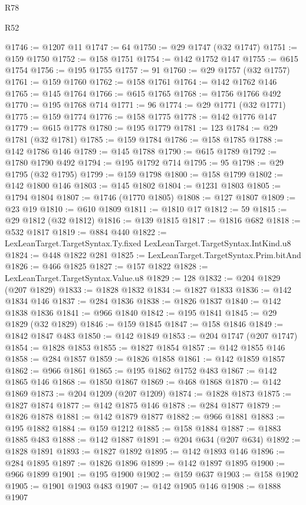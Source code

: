 \begin{lexlean}{R78}
\begin{lexlean}{R52}
\begin{coremodule}
{{{{{{{{{{{{{{{{{{{{{{{{{{{{{{{{{{{{{{{{{{{{{{{{{{{{{{{{{{{{{{{{{{{{{{{{{{{{{{{{{{{{{{{{{{{{{{{{{{{{{{{{{{{{{{{{{{{{{{{{{{{{{{{{{{{{{{{{{{{{{{{{{{{{{{{{{{{{{{{{{{{{{{{{{{{{{{{{{{{{{{{{{{{{{{{{{{{{{{@1746 := @1207 @11
@1747 := 64
@1750 := @29 @1747 (@32 @1747)
@1751 := @159 @1750
@1752 := @158 @1751
@1754 := @142 @1752 @147
@1755 := @615 @1754
@1756 := @195 @1755
@1757 := 91
@1760 := @29 @1757 (@32 @1757)
@1761 := @159 @1760
@1762 := @158 @1761
@1764 := @142 @1762 @146
@1765 := @145 @1764
@1766 := @615 @1765
@1768 := @1756 @1766 @492
@1770 := @195 @1768 @714
@1771 := 96
@1774 := @29 @1771 (@32 @1771)
@1775 := @159 @1774
@1776 := @158 @1775
@1778 := @142 @1776 @147
@1779 := @615 @1778
@1780 := @195 @1779
@1781 := 123
@1784 := @29 @1781 (@32 @1781)
@1785 := @159 @1784
@1786 := @158 @1785
@1788 := @142 @1786 @146
@1789 := @145 @1788
@1790 := @615 @1789
@1792 := @1780 @1790 @492
@1794 := @195 @1792 @714
@1795 := 95
@1798 := @29 @1795 (@32 @1795)
@1799 := @159 @1798
@1800 := @158 @1799
@1802 := @142 @1800 @146
@1803 := @145 @1802
@1804 := @1231 @1803
@1805 := @1794 @1804
@1807 := @1746 (@1770 @1805)
@1808 := @127 @1807
@1809 := @23 @19
@1810 := @610 @1809
@1811 := @1810 @17
@1812 := 59
@1815 := @29 @1812 (@32 @1812)
@1816 := @139 @1815
@1817 := @1816 @682
@1818 := @532 @1817
@1819 := @884 @440
@1822 := LexLeanTarget.TargetSyntax.Ty.fixed LexLeanTarget.TargetSyntax.IntKind.u8
@1824 := @448 @1822 @281
@1825 := LexLeanTarget.TargetSyntax.Prim.bitAnd
@1826 := @466 @1825
@1827 := @157 @1822
@1828 := LexLeanTarget.TargetSyntax.Value.u8
@1829 := 128
@1832 := @204 @1829 (@207 @1829)
@1833 := @1828 @1832
@1834 := @1827 @1833
@1836 := @142 @1834 @146
@1837 := @284 @1836
@1838 := @1826 @1837
@1840 := @142 @1838 @1836
@1841 := @966 @1840
@1842 := @195 @1841
@1845 := @29 @1829 (@32 @1829)
@1846 := @159 @1845
@1847 := @158 @1846
@1849 := @1842 @1847 @483
@1850 := @142 @1849
@1853 := @204 @1747 (@207 @1747)
@1854 := @1828 @1853
@1855 := @1827 @1854
@1857 := @142 @1855 @146
@1858 := @284 @1857
@1859 := @1826 @1858
@1861 := @142 @1859 @1857
@1862 := @966 @1861
@1865 := @195 @1862 @1752 @483
@1867 := @142 @1865 @146
@1868 := @1850 @1867
@1869 := @468 @1868
@1870 := @142 @1869
@1873 := @204 @1209 (@207 @1209)
@1874 := @1828 @1873
@1875 := @1827 @1874
@1877 := @142 @1875 @146
@1878 := @284 @1877
@1879 := @1826 @1878
@1881 := @142 @1879 @1877
@1882 := @966 @1881
@1883 := @195 @1882
@1884 := @159 @1212
@1885 := @158 @1884
@1887 := @1883 @1885 @483
@1888 := @142 @1887
@1891 := @204 @634 (@207 @634)
@1892 := @1828 @1891
@1893 := @1827 @1892
@1895 := @142 @1893 @146
@1896 := @284 @1895
@1897 := @1826 @1896
@1899 := @142 @1897 @1895
@1900 := @966 @1899
@1901 := @195 @1900
@1902 := @159 @637
@1903 := @158 @1902
@1905 := @1901 @1903 @483
@1907 := @142 @1905 @146
@1908 := @1888 @1907
}}}}}}}}}}}}}}}}}}}}}}}}}}}}}}}}}}}}}}}}}}}}}}}}}}}}}}}}}}}}}}}}}}}}}}}}}}}}}}}}}}}}}}}}}}}}}}}}}}}}}}}}}}}}}}}}}}}}}}}}}}}}}}}}}}}}}}}}}}}}}}}}}}}}}}}}}}}}}}}}}}}}}}}}}}}}}}}}}}}}}}}}}}}}}}}}}}}}}}
\end{coremodule}
\end{lexlean}
\end{lexlean}
